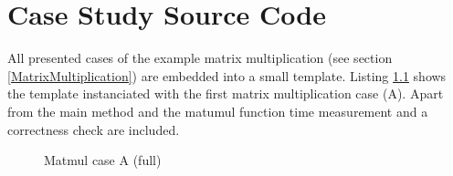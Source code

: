 
\chapter{Case Study Source Code}
\label{AppendixA}

All presented cases of the example matrix multiplication 
(see section \ref{MatrixMultiplication}) are embedded into a small template.
Listing \ref{lst:MatmulVersionAFull} shows the template instanciated with the 
first matrix multiplication case (A). Apart from the main method and the matumul function 
time measurement and a correctness check are included.


\begin{figure}[htpb]
  \centering
    \begin{minipage}[c]{\textwidth}
      
    \end{minipage}
   \caption{Matmul case A (full)}
   \label{lst:MatmulVersionAFull}
\end{figure}
